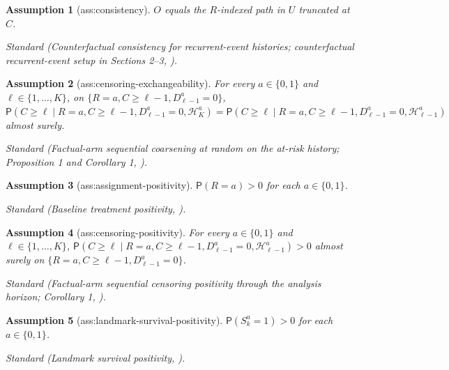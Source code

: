 \documentclass{article}
\newtheorem{assumption}{Assumption}
\begin{document}
\begin{assumption}[ass:consistency]\label{ass:consistency}
\(O\) equals the \(R\)-indexed path in \(U\) truncated at \(C\).
\par\smallskip\noindent\emph{Standard} (Counterfactual consistency for recurrent-event histories; counterfactual recurrent-event setup in Sections 2--3, \cite{JanvinYoungRyalenStensrud2023}).
\end{assumption}

\begin{assumption}[ass:censoring-exchangeability]\label{ass:censoring-exchangeability}
For every \(a\in\{0,1\}\) and \(\ell\in\{1,\ldots,K\}\), on \(\{R=a,C\ge\ell-1,D_{\ell-1}^a=0\}\), \(\mathsf P(C\ge\ell\mid R=a,C\ge\ell-1,D_{\ell-1}^a=0,\mathcal H_K^a)=\mathsf P(C\ge\ell\mid R=a,C\ge\ell-1,D_{\ell-1}^a=0,\mathcal H_{\ell-1}^a)\) almost surely.
\par\smallskip\noindent\emph{Standard} (Factual-arm sequential coarsening at random on the at-risk history; Proposition 1 and Corollary 1, \cite{BaerStrawdermanErtefaie2023}).
\end{assumption}

\begin{assumption}[ass:assignment-positivity]\label{ass:assignment-positivity}
\(\mathsf P(R=a)>0\) for each \(a\in\{0,1\}\).
\par\smallskip\noindent\emph{Standard} (Baseline treatment positivity, \cite{JanvinRyalenSarvetStensrud2025}).
\end{assumption}

\begin{assumption}[ass:censoring-positivity]\label{ass:censoring-positivity}
For every \(a\in\{0,1\}\) and \(\ell\in\{1,\ldots,K\}\), \(\mathsf P(C\ge\ell\mid R=a,C\ge\ell-1,D_{\ell-1}^a=0,\mathcal H_{\ell-1}^a)>0\) almost surely on \(\{R=a,C\ge\ell-1,D_{\ell-1}^a=0\}\).
\par\smallskip\noindent\emph{Standard} (Factual-arm sequential censoring positivity through the analysis horizon; Corollary 1, \cite{BaerStrawdermanErtefaie2023}).
\end{assumption}

\begin{assumption}[ass:landmark-survival-positivity]\label{ass:landmark-survival-positivity}
\(\mathsf P(S_k^a=1)>0\) for each \(a\in\{0,1\}\).
\par\smallskip\noindent\emph{Standard} (Landmark survival positivity, \cite{JanvinRyalenSarvetStensrud2025}).
\end{assumption}
\end{document}
